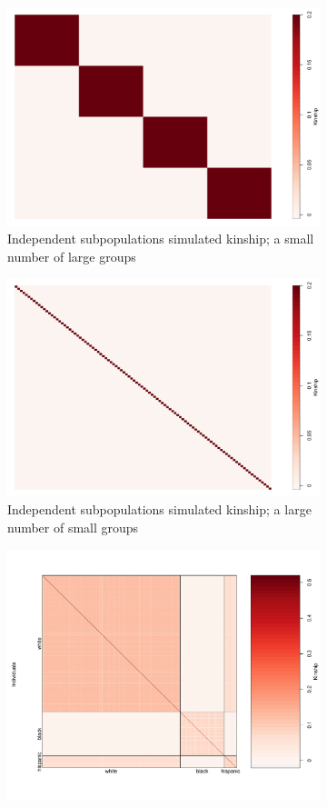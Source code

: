 
\begin{figure}[H]
\begin{subfigure}{.8\textwidth}
  \centering
  \includegraphics[width=.7\linewidth]{figures/kinship1}  
  \caption{Independent subpopulations simulated kinship; a small number of large groups}
  \label{fig:large_groups}
\end{subfigure}
\newline
\begin{subfigure}{.8\textwidth}
  \centering
  \includegraphics[width=.7\linewidth]{figures/kinship2}  
  \caption{Independent subpopulations simulated kinship; a large number of small groups}
  \label{fig:small_groups}
\end{subfigure}
\newline
\begin{subfigure}{.8\textwidth}
  \centering
  \includegraphics[width=.7\linewidth]{figures/vanderwas_kinship.pdf}  

\end{subfigure}
\end{figure}

